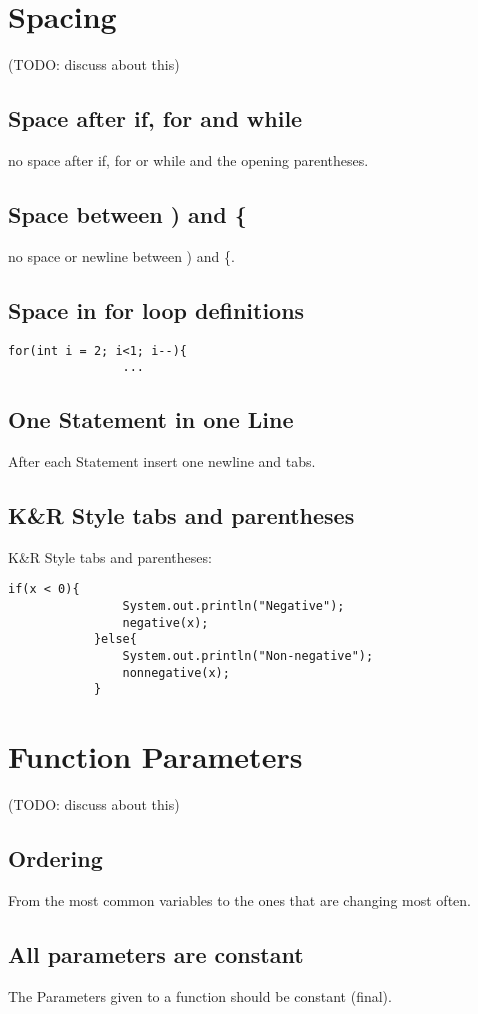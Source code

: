 \documentclass[fontsize=11,DIV=10]{scrartcl}
\begin{document}
\section{Spacing}
	(TODO: discuss about this)
	\subsection{Space after if, for and while}
		no space after if, for or while and the opening parentheses.
	\subsection{Space between ) and \{}
		no space or newline between ) and \{.
	\subsection{Space in for loop definitions}
		\begin{lstlisting}[tabsize=2]
			for(int i = 2; i<1; i--){
				...
		\end{lstlisting}
	\subsection{One Statement in one Line}
		After each Statement insert one newline and tabs.
	\subsection{K\&R Style tabs and parentheses}
		K\&R Style tabs and parentheses:
		\begin{lstlisting}[tabsize=2]
			if(x < 0){
				System.out.println("Negative");
				negative(x);
			}else{
				System.out.println("Non-negative");
				nonnegative(x);
			}
		\end{lstlisting}


\section{Function Parameters}
		(TODO: discuss about this)
	\subsection{Ordering}
		From the most common variables to the ones that are changing most often.
	\subsection{All parameters are constant}
		The Parameters given to a function should be constant (final).
\end{document}
